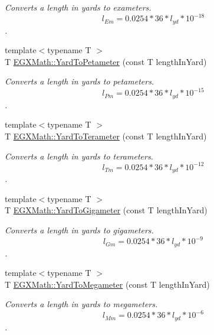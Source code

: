 \begin{DoxyCompactItemize}
\begin{DoxyCompactList}\small\item\em Converts a length in yards to exameters. \[ l_{Em}=0.0254 * 36 * l_{yd} * 10^{-18} \]. \end{DoxyCompactList}\item 
{\footnotesize template$<$typename T $>$ }\\T \mbox{\hyperlink{group___e_g_x_math-_conversions-_length_conversions-_imperial-_yard-_s_i_gac5e73459c6a98c1aa2e613e03f7b2e57}{E\+G\+X\+Math\+::\+Yard\+To\+Petameter}} (const T length\+In\+Yard)
\begin{DoxyCompactList}\small\item\em Converts a length in yards to petameters. \[ l_{Pm}=0.0254 * 36 * l_{yd} * 10^{-15} \]. \end{DoxyCompactList}\item 
{\footnotesize template$<$typename T $>$ }\\T \mbox{\hyperlink{group___e_g_x_math-_conversions-_length_conversions-_imperial-_yard-_s_i_ga67c4bd89e074c1615f4f67d6877e93d0}{E\+G\+X\+Math\+::\+Yard\+To\+Terameter}} (const T length\+In\+Yard)
\begin{DoxyCompactList}\small\item\em Converts a length in yards to terameters. \[ l_{Tm}=0.0254 * 36 * l_{yd} * 10^{-12} \]. \end{DoxyCompactList}\item 
{\footnotesize template$<$typename T $>$ }\\T \mbox{\hyperlink{group___e_g_x_math-_conversions-_length_conversions-_imperial-_yard-_s_i_gad6931b2e09213f4f3ceee9c5cc6a4b44}{E\+G\+X\+Math\+::\+Yard\+To\+Gigameter}} (const T length\+In\+Yard)
\begin{DoxyCompactList}\small\item\em Converts a length in yards to gigameters. \[ l_{Gm}=0.0254 * 36 * l_{yd} * 10^{-9} \]. \end{DoxyCompactList}\item 
{\footnotesize template$<$typename T $>$ }\\T \mbox{\hyperlink{group___e_g_x_math-_conversions-_length_conversions-_imperial-_yard-_s_i_ga423d6a2f1a68d54370f3c9967e6c877e}{E\+G\+X\+Math\+::\+Yard\+To\+Megameter}} (const T length\+In\+Yard)
\begin{DoxyCompactList}\small\item\em Converts a length in yards to megameters. \[ l_{Mm}=0.0254 * 36 * l_{yd} * 10^{-6} \]. \end{DoxyCompactList}\item 

\end{DoxyCompactItemize}
